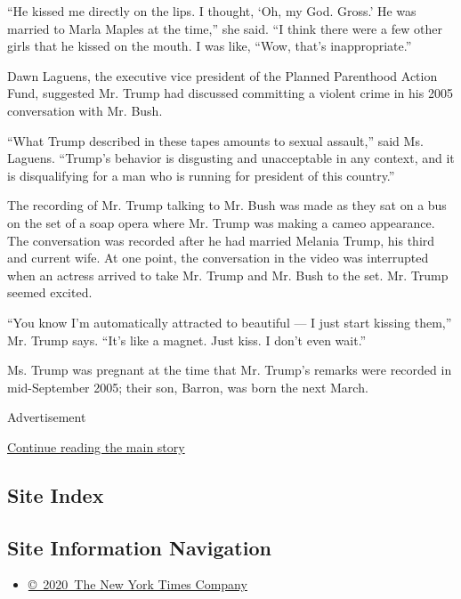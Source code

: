 ``He kissed me directly on the lips. I thought, `Oh, my God. Gross.' He
was married to Marla Maples at the time,'' she said. ``I think there
were a few other girls that he kissed on the mouth. I was like, ``Wow,
that's inappropriate.''

Dawn Laguens, the executive vice president of the Planned Parenthood
Action Fund, suggested Mr. Trump had discussed committing a violent
crime in his 2005 conversation with Mr. Bush.

``What Trump described in these tapes amounts to sexual assault,'' said
Ms. Laguens. ``Trump's behavior is disgusting and unacceptable in any
context, and it is disqualifying for a man who is running for president
of this country.''

The recording of Mr. Trump talking to Mr. Bush was made as they sat on a
bus on the set of a soap opera where Mr. Trump was making a cameo
appearance. The conversation was recorded after he had married Melania
Trump, his third and current wife. At one point, the conversation in the
video was interrupted when an actress arrived to take Mr. Trump and Mr.
Bush to the set. Mr. Trump seemed excited.

``You know I'm automatically attracted to beautiful --- I just start
kissing them,'' Mr. Trump says. ``It's like a magnet. Just kiss. I don't
even wait.''

Ms. Trump was pregnant at the time that Mr. Trump's remarks were
recorded in mid-September 2005; their son, Barron, was born the next
March.

Advertisement

\protect\hyperlink{after-bottom}{Continue reading the main story}

\hypertarget{site-index}{%
\subsection{Site Index}\label{site-index}}

\hypertarget{site-information-navigation}{%
\subsection{Site Information
Navigation}\label{site-information-navigation}}

\begin{itemize}
\tightlist
\item
  \href{https://help.nytimes.com/hc/en-us/articles/115014792127-Copyright-notice}{©~2020~The
  New York Times Company}
\end{itemize}

